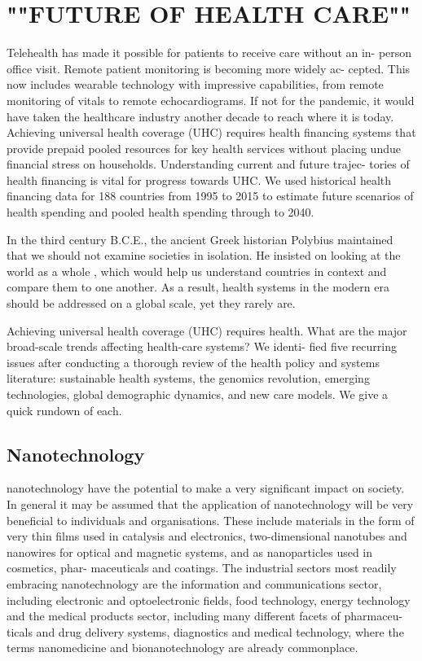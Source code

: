\documentclass{article}
\begin{document}
\section{""FUTURE OF HEALTH CARE""}
Telehealth has made it possible for patients to receive care without an in-
person office visit. Remote patient monitoring is becoming more widely ac-
cepted. This now includes wearable technology with impressive capabilities,
from remote monitoring of vitals to remote echocardiograms. If not for the
pandemic, it would have taken the healthcare industry another decade to
reach where it is today.
Achieving universal health coverage (UHC) requires health financing systems
that provide prepaid pooled resources for key health services without placing
undue financial stress on households. Understanding current and future trajec-
tories of health financing is vital for progress towards UHC. We used historical
health financing data for 188 countries from 1995 to 2015 to estimate future
scenarios of health spending and pooled health spending through to 2040.


In the third century B.C.E., the ancient Greek historian Polybius maintained
that we should not examine societies in isolation. He insisted on looking at the
world as a whole , which would help us understand countries in context and
compare them to one another. As a result, health systems in the modern era
should be addressed on a global scale, yet they rarely are.



Achieving universal health coverage (UHC) requires health.
What are the major broad-scale trends affecting health-care systems? We identi-
fied five recurring issues after conducting a thorough review of the health policy
and systems literature: sustainable health systems, the genomics revolution,
emerging technologies, global demographic dynamics, and new care models. We
give a quick rundown of each.

\subsection{Nanotechnology}
 nanotechnology have the potential to make
a very significant impact on society. In general it may be assumed that
the application of nanotechnology will be very beneficial to individuals and
organisations. These include materials in the form of very thin films used
in catalysis and electronics, two-dimensional nanotubes and nanowires for
optical and magnetic systems, and as nanoparticles used in cosmetics, phar-
maceuticals and coatings. The industrial sectors most readily embracing
nanotechnology are the information and communications sector, including
electronic and optoelectronic fields, food technology, energy technology and
the medical products sector, including many different facets of pharmaceu-
ticals and drug delivery systems, diagnostics and medical technology, where
the terms nanomedicine and bionanotechnology are already commonplace.
\end{document}
